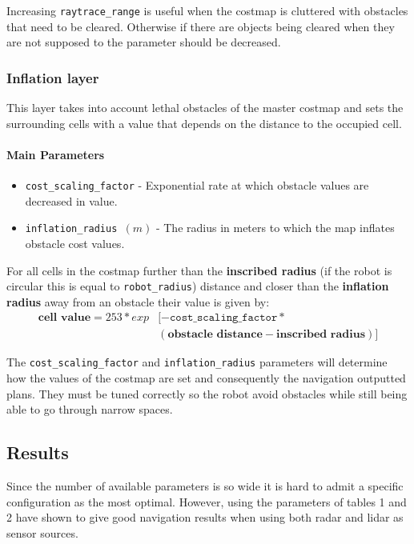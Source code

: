 \documentclass[12pt]{article}
\begin{document}
Increasing \texttt{raytrace\_range} is useful when the costmap is cluttered with obstacles that need to be cleared. Otherwise if there are objects being cleared when they are not supposed to the parameter should be decreased.

\subsubsection{Inflation layer}
This layer takes into account lethal obstacles of the master costmap and sets the surrounding cells with a value that depends on the distance to the occupied cell.
\paragraph{Main Parameters \cite{inflation}}
\begin{itemize}[label={}]
    \item \texttt{cost\_scaling\_factor} - Exponential rate at which obstacle values are decreased in value.
    \item \texttt{inflation\_radius $(m)$} - The radius in meters to which the map inflates obstacle cost values.
\end{itemize}
 For all cells in the costmap further than the \textbf{inscribed radius} (if the robot is circular this is equal to \texttt{robot\_radius}) distance and closer than the \textbf{inflation radius}  away from an obstacle their value is given by:
\begin{align*}
    \textbf{cell value}=253*exp & [-\texttt{cost\_scaling\_factor}*\\
    & (\textbf{obstacle distance} - \textbf{inscribed radius})]
\end{align*}

The \texttt{cost\_scaling\_factor} and \texttt{inflation\_radius} parameters will determine how the values of the costmap are set and consequently  the navigation outputted plans. They must be tuned correctly so the robot avoid obstacles while still being able to go through narrow spaces.  


\subsection{Results}
Since the number of available parameters is so wide it is hard to admit a specific configuration as the most optimal. However, using the parameters of tables 1 and 2 have shown to give good navigation results when using both radar and lidar as sensor sources.
\end{document}
